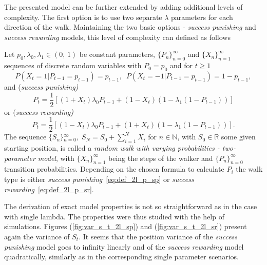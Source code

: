 \documentclass[runningheads]{CMSIM}
\begin{document}
    The presented model can be further extended by adding additional levels
    of complexity.
    The first option is to use two separate $\lambda$
    parameters for each direction of the walk.
    Maintaining the two basic
    options - \emph{success punishing} and \emph{success rewarding} models,
    this level of complexity can defined as follows~\cite{ja2019apmat}
    \begin{definition}
        Let $\ensuremath{p_{0},\lambda_{0},\lambda_{1}\in(0,\,1)}$ be constant
        parameters, ${\{P_{n}\}}_{n=0}^{\infty}$ and ${\{X_{n}\}}_{n=1}^{\infty}$
        sequences of discrete random variables with $P_{0}=p_{0}$ and for
        $t\ge1$
        \[
            P(X_{t}=1|P_{t-1}=p_{t-1})=p_{t-1},\,\,\,P(X_{t}=-1|P_{t-1}=p_{t-1})=1-p_{t-1},
        \]
        and (\emph{success punishing)}
        \begin{equation}
            P_{t}=\frac{1}{2}[(1+X_{t})\lambda_{0}P_{t-1}+(1-X_{t})(1-\lambda_{1}(1-P_{t-1}))]\label{eq:def_2l_p_sp}
        \end{equation}
        or (\emph{success rewarding)}
        \begin{equation}
            P_{t}=\frac{1}{2}[(1-X_{t})\lambda_{0}P_{t-1}+(1+X_{t})(1-\lambda_{1}(1-P_{t-1}))].\label{eq:def_2l_p_sr}
        \end{equation}
        The sequence ${\{S_{n}\}}{}_{n=0}^{\infty},\;S_{N}=S_{0}+\sum_{i=1}^{N}X_{i}$
        for $n\in\mathbb{N}$, with $S_{0}\in\mathbb{R}$ some given starting
        position, is called a \emph{random walk with varying probabilities
        - two-parameter model}, with ${\{X_{n}\}}_{n=1}^{\infty}$ being the
        steps of the walker and ${\{P_{n}\}}_{n=0}^{\infty}$ transition probabilities.
        Depending on the chosen formula to calculate $P_{i}$ the walk type
        is either \emph{success punishing}~\eqref{eq:def_2l_p_sp} or \emph{success
        rewarding}~\eqref{eq:def_2l_p_sr}.

        The derivation of exact model properties is not so straightforward
        as in the case with single lambda.
        The properties were thus studied
        with the help of simulations.
        Figures (\ref{fig:var_s_t_2l_sp}) and
        (\ref{fig:var_s_t_2l_sr}) present again the variance of $S_{t}$.
        It seems that the position variance of the \emph{success punishing}
        model goes to infinity linearly and of the \emph{success rewarding}
        model quadratically, similarly as in the corresponding single parameter
        scenarios.


\end{definition}
\end{document}
